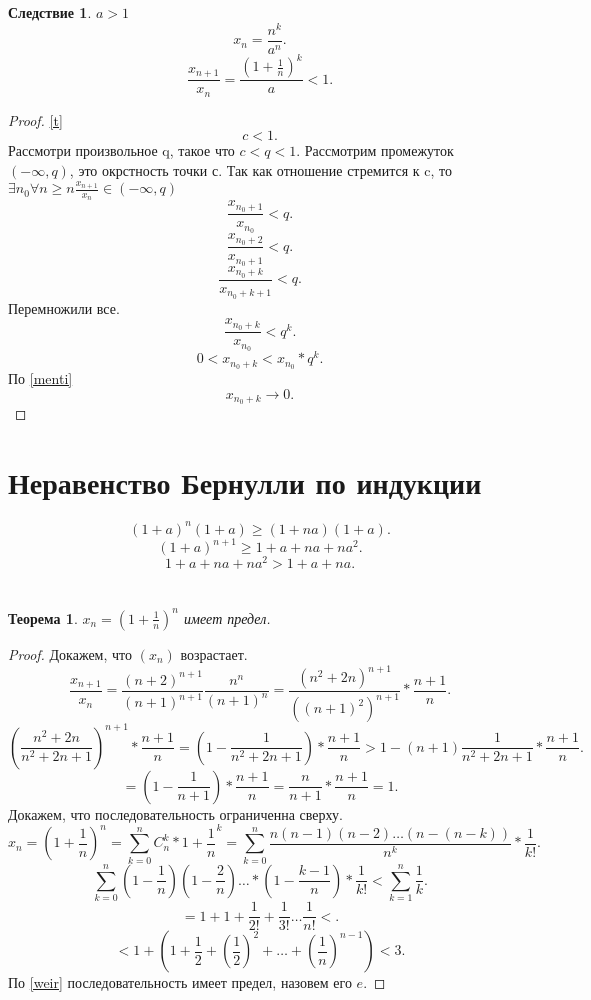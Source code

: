 \documentclass[a4paper]{article}
\newtheorem{theorem}{Теорема}
\newtheorem{corollary}{Следствие}[theorem]
\begin{document}
\begin{corollary}
	$a > 1$
	\[
		x_n = \frac{n^k}{a^n}
		.\]
	\[
		\frac{x_{n+1}}{x_n} = \frac{(1 + \frac{1}{n})^k}{a} < 1
		.\]
\end{corollary}
\begin{proof}\ref{t}
	\[
		c < 1
		.\]
	Рассмотри произвольное q, такое что $c < q < 1$. Рассмотрим промежуток  $(-\infty,q)$, это окрстность точки с. Так как отношение стремится к c, то  $\exists  n_0 \forall  n\ge n \frac{x_{n + 1}}{x_n}
		\in (-\infty,q)$
	\[
		\frac{x_{n_0 + 1}}{x_{n_0}} < q
		.\]
	\[
		\frac{x_{n_0 + 2}}{x_{n_0 + 1}} < q
		.\]
	\[
		\frac{x_{n_0 + k}}{x_{n_0 + k + 1}} < q
		.\]
	Перемножили все.
	\[
		\frac{x_{n_0 + k}}{x_{n_0}} < q^k
		.\]
	\[
		0 <  x_{n_0 + k} < x_{n_0} * q^k
		.\]
	По \ref{menti}
	\[
		x_{n_0 + k} \to 0
		.\]
\end{proof}
\section{Неравенство Бернулли по индукции} \label{ber}
\[
	(1 + a)^n (1 + a) \ge (1 +na)(1 + a)
	.\]
\[
	(1 + a)^{n + 1} \ge  1 + a + na + na^2
	.\]
\[
	1 + a + na + na^2 > 1 + a + na
	.\]
\section{}
\begin{theorem}
	$x_n  = (1 + \frac{1}{n})^n$ имеет предел.
\end{theorem}
\begin{proof}
	Докажем, что $( x_n )$ возрастает.
	\[
		\frac{x_{n + 1}}{x_n} = \frac{(n + 2)^{n + 1}}{(n + 1)^{n + 1}} \frac{n^n}{(n + 1)^{n}}=
		\frac{(n^2 + 2n)^{n + 1}}{( (n + 1)^2 )^{n + 1}} * \frac{n + 1}{n}
		.\]
	\[
		(\frac{n^2 + 2n}{n^2 + 2n + 1})^{n + 1} * \frac{n + 1}{n} =
		(1 - \frac{1}{n^2 + 2n + 1}) * \frac{n+1}{n} > 1 - (n + 1) \frac{1}{n^2+2n +1} * \frac{n+1}{n}
		.\]
	\[
		= ( 1 - \frac{1}{n + 1}) * \frac{n + 1}{n} = \frac{n}{n+1} * \frac{n + 1}{n} = 1
		.\]
	Докажем, что последовательность ограниченна сверху.
	\[
		x_n = (1 + \frac{1}{n})^n = \sum_{k=0}^{n} C_{n}^k *1 + \frac{1}{n}^k =
		\sum_{k = 0}^{n} \frac{n (n - 1) (n -2) \dots (n - (n - k))}{n^k} * \frac{1}{k!}
		.\]
	\[
		\sum_{k=0}^{n} (1 - \frac{1}{n}) (1 - \frac{2}{n}) \dots * (1-  \frac{k - 1}{n})*\frac{1}{k!} < \sum_{k = 1}^{n} \frac{1}{k}
		.\]
	\[
		= 1 + 1 + \frac{1}{2!} + \frac{1}{3!} \dots \frac{1}{n!} <
		.\]
	\[
		< 1 + (1 + \frac{1}{2} + (\frac{1}{2})^2 + \dots + (\frac{1}{n})^{n -1}) < 3
		.\]
	По \ref{weir} последовательность имеет предел, назовем его $e$.
\end{proof}
\end{document}
